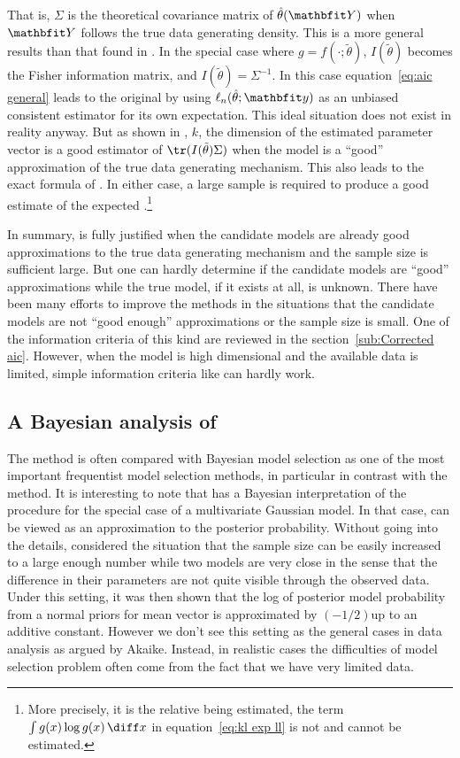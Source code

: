 That is, $\Sigma$ is the theoretical covariance matrix of $\hat\theta(\bfY)$ when
$\bfY$ follows the true data generating density. This is a more general
results than that found in \textcite{Akaike:1973uc}. In the special case where
$g = f(\cdot;\tilde\theta)$, $I(\tilde\theta)$ becomes the Fisher information matrix, and
$I(\tilde\theta) = \Sigma^{-1}$. In this case equation~\eqref{eq:aic general} leads
to the original \aic by using $\ell_n(\hat\theta;\bfy)$ as an unbiased consistent
estimator for its own expectation. This ideal situation does not exist in
reality anyway. But as shown in \textcite{Shibata:1989tm}, $k$, the dimension
of the estimated parameter vector is a good estimator of $\tr(I(\tilde\theta)\Sigma)$
when the model is a ``good'' approximation of the true data generating
mechanism. This also leads to the exact formula of \aic. In either case, a
large sample is required to produce a good estimate of the expected
\kl.\footnote{More precisely, it is the relative \kl being estimated, the term
  $\int g(x)\log g(x)\intd x$ in equation~\eqref{eq:kl exp ll} is not and cannot
  be estimated.}

In summary, \aic is fully justified when the candidate models are already good
approximations to the true data generating mechanism and the sample size is
sufficient large. But one can hardly determine if the candidate models are
``good'' approximations while the true model, if it exists at all, is unknown.
There have been many efforts to improve the \aic methods in the situations
that the candidate models are not ``good enough'' approximations or the sample
size is small. One of the information criteria of this kind are reviewed in
the section~\ref{sub:Corrected aic}. However, when the model is high
dimensional and the available data is limited, simple information criteria
like \aic can hardly work.

\subsection{A Bayesian analysis of \protect\aic}
\label{sub:A Bayesian analysis of aic}

The \aic method is often compared with Bayesian model selection as one of the
most important frequentist model selection methods, in particular in contrast
with the \bic method. It is interesting to note that \textcite{Akaike:1978ti}
has a Bayesian interpretation of the \aic procedure for the special case of a
multivariate Gaussian model. In that case, \aic can be viewed as an
approximation to the posterior probability. Without going into the details,
\textcite{Akaike:1978ti} considered the situation that the sample size can be
easily increased to a large enough number while two models are very close in
the sense that the difference in their parameters are not quite visible
through the observed data. Under this setting, it was then shown that the log
of posterior model probability from a normal priors for mean vector is
approximated by $(-1/2)$\aic up to an additive constant. However we don't see
this setting as the general cases in data analysis as argued by Akaike.
Instead, in realistic cases the difficulties of model selection problem often
come from the fact that we have very limited data.

